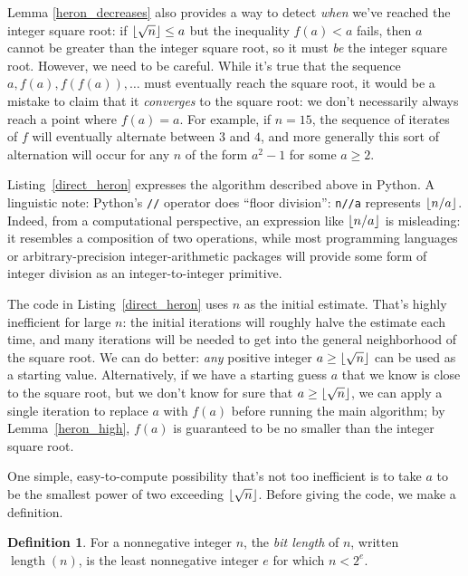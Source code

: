 \documentclass[a4paper]{article}
\DeclarePairedDelimiter\floor{\lfloor}{\rfloor}
\DeclareMathOperator{\length}{length}
\theoremstyle{plain}
\theoremstyle{definition}
\newtheorem{definition}[theorem]{Definition}
\begin{document}
Lemma \ref{heron_decreases} also provides a way to detect \emph{when}
we've reached the integer square root: if $\floor{\sqrt n} \le a$ but the
inequality $f(a) < a$ fails, then $a$ cannot be greater than the integer square
root, so it must \emph{be} the integer square root. However, we need to be
careful. While it's true that the sequence $a, f(a), f(f(a)), \dots$ must
eventually reach the square root, it would be a mistake to claim that it
\emph{converges} to the square root: we don't necessarily always reach a point
where $f(a) = a$. For example, if $n=15$, the sequence of iterates of $f$ will
eventually alternate between $3$ and $4$, and more generally this sort of
alternation will occur for any $n$ of the form $a^2 - 1$ for some $a \ge 2$.

Listing~\ref{direct_heron} expresses the algorithm described above in Python. A
linguistic note: Python's \lstinline$//$ operator does ``floor division'':
\lstinline$n//a$ represents $\floor{n / a}$. Indeed, from a computational
perspective, an expression like $\floor{n / a}$ is misleading: it resembles a
composition of two operations, while most programming languages or
arbitrary-precision integer-arithmetic packages will provide some form of
integer division as an integer-to-integer primitive.



The code in Listing~\ref{direct_heron} uses $n$ as the initial estimate. That's
highly inefficient for large $n$: the initial iterations will roughly halve the
estimate each time, and many iterations will be needed to get into the general
neighborhood of the square root. We can do better: \emph{any} positive integer
$a \ge \floor{\sqrt n}$ can be used as a starting value. Alternatively, if we
have a starting guess $a$ that we know is close to the square root, but we
don't know for sure that $a \ge \floor{\sqrt n}$, we can apply a single
iteration to replace $a$ with $f(a)$ before running the main algorithm; by
Lemma~\ref{heron_high}, $f(a)$ is guaranteed to be no smaller than the integer
square root.

One simple, easy-to-compute possibility that's not too inefficient is to take
$a$ to be the smallest power of two exceeding $\floor{\sqrt n}$. Before giving
the code, we make a definition.

\begin{definition}
  For a nonnegative integer $n$, the \emph{bit length} of $n$, written
  $\length(n)$, is the least nonnegative integer $e$ for which $n < 2^e$.
\end{definition}
\end{document}
